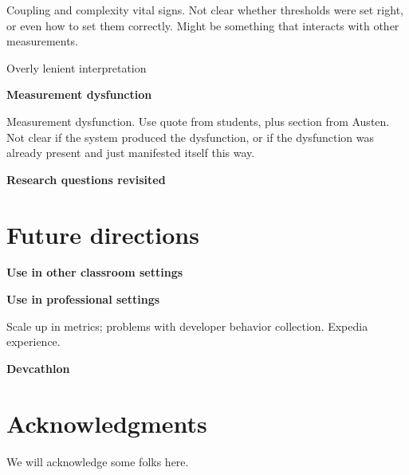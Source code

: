 \documentclass{acm_proc_article-sp}
\begin{document}
Coupling and complexity vital signs.  Not clear whether thresholds were set right, or even how to set them correctly.  Might be something that interacts with other measurements. 

Overly lenient interpretation

{\bf Measurement dysfunction}

Measurement dysfunction.  Use quote from students, plus section from Austen.  Not clear if the system produced the
dysfunction, or if the dysfunction was already present and just manifested itself this way. 

{\bf Research questions revisited}


\section{Future directions}
\label{sec:conclusions}

{\bf Use in other classroom settings}

{\bf Use in professional settings}

Scale up in metrics; problems with developer behavior collection. Expedia experience. 

{\bf Devcathlon}


\section{Acknowledgments}

We will acknowledge some folks here.


  

\end{document}
